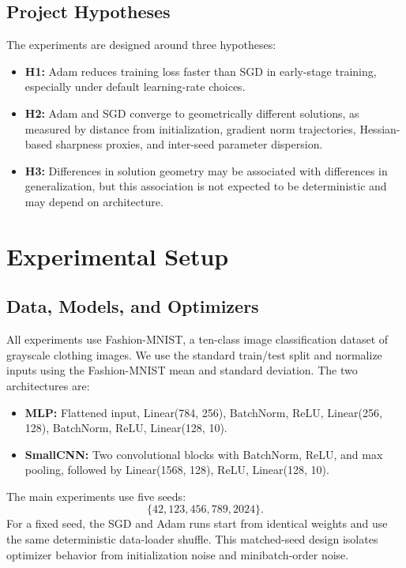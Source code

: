 \documentclass[11pt]{article}
\begin{document}
\subsection{Project Hypotheses}

The experiments are designed around three hypotheses:
\begin{itemize}
    \item \textbf{H1:} Adam reduces training loss faster than SGD in early-stage training, especially under default learning-rate choices.
    \item \textbf{H2:} Adam and SGD converge to geometrically different solutions, as measured by distance from initialization, gradient norm trajectories, Hessian-based sharpness proxies, and inter-seed parameter dispersion.
    \item \textbf{H3:} Differences in solution geometry may be associated with differences in generalization, but this association is not expected to be deterministic and may depend on architecture.
\end{itemize}

\section{Experimental Setup}
\label{sec:setup}

\subsection{Data, Models, and Optimizers}

All experiments use Fashion-MNIST, a ten-class image classification dataset of grayscale clothing images. We use the standard train/test split and normalize inputs using the Fashion-MNIST mean and standard deviation. The two architectures are:
\begin{itemize}
    \item \textbf{MLP:} Flattened input, Linear(784, 256), BatchNorm, ReLU, Linear(256, 128), BatchNorm, ReLU, Linear(128, 10).
    \item \textbf{SmallCNN:} Two convolutional blocks with BatchNorm, ReLU, and max pooling, followed by Linear(1568, 128), ReLU, Linear(128, 10).
\end{itemize}

The main experiments use five seeds:
\[
\{42, 123, 456, 789, 2024\}.
\]
For a fixed seed, the SGD and Adam runs start from identical weights and use the same deterministic data-loader shuffle. This matched-seed design isolates optimizer behavior from initialization noise and minibatch-order noise.
\end{document}
